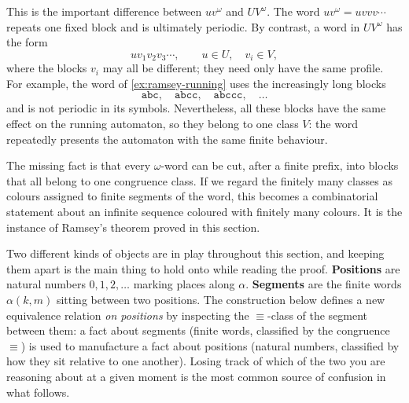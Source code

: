This is the important difference between $uv^\omega$ and
$UV^\omega$.  The word $uv^\omega=uvvv\cdots$ repeats one fixed block
and is ultimately periodic.  By contrast, a word in $UV^\omega$ has
the form
\[
  uv_1v_2v_3\cdots,
  \qquad u\in U,\quad v_i\in V,
\]
where the blocks $v_i$ may all be different; they need only have the
same profile.  For example, the word of \cref{ex:ramsey-running} uses
the increasingly long blocks
\[
  \mathtt{abc},\quad \mathtt{abcc},\quad
  \mathtt{abccc},\quad\ldots
\]
and is not periodic in its symbols.  Nevertheless, all these blocks
have the same effect on the running automaton, so they belong to one
class $V$: the word repeatedly presents the automaton with the same
finite behaviour.

The missing fact is that every $\omega$-word can be cut, after a finite
prefix, into blocks that all belong to one congruence class.  If we
regard the finitely many classes as colours assigned to finite
segments of the word, this becomes a combinatorial statement about an
infinite sequence coloured with finitely many colours.  It is the
instance of Ramsey's theorem proved in this section.


Two different kinds of objects are in play throughout this section, and
keeping them apart is the main thing to hold onto while reading the
proof.  \textbf{Positions} are natural numbers $0,1,2,\ldots$ marking
places along $\alpha$.  \textbf{Segments} are the finite words
$\alpha(k,m)$ sitting between two positions.  The construction below
defines a new equivalence relation \emph{on positions} by inspecting
the $\equiv$-class of the segment between them: a fact about segments
(finite words, classified by the congruence $\equiv$) is used to
manufacture a fact about positions (natural numbers, classified by how
they sit relative to one another).  Losing track of which of the two
you are reasoning about at a given moment is the most common source of
confusion in what follows.

